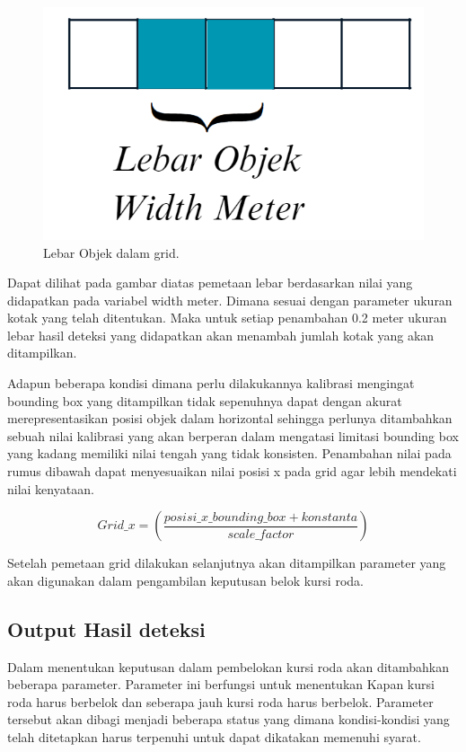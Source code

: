 \begin{figure}[H]
  \centering
  \includegraphics[scale=0.3]{gambar/Lebarobjek.png}
  \caption{Lebar Objek dalam grid.}
  \label{fig:Lebar Objek dalam grid.}
\end{figure}

Dapat dilihat pada gambar diatas pemetaan lebar berdasarkan nilai yang didapatkan pada variabel width meter. Dimana sesuai dengan parameter ukuran kotak yang telah ditentukan. Maka untuk setiap penambahan 0.2 meter ukuran lebar hasil deteksi yang didapatkan akan menambah jumlah kotak yang akan ditampilkan. 

Adapun beberapa kondisi dimana perlu dilakukannya kalibrasi mengingat bounding box yang ditampilkan tidak sepenuhnya dapat dengan akurat merepresentasikan posisi objek dalam horizontal sehingga perlunya ditambahkan sebuah nilai kalibrasi yang akan berperan dalam mengatasi limitasi bounding box yang kadang memiliki nilai tengah yang tidak konsisten. Penambahan nilai pada rumus dibawah dapat menyesuaikan nilai posisi x pada grid agar lebih mendekati nilai kenyataan.

\begin{equation}
    Grid\_x = (\frac{posisi\_x\_bounding\_box +konstanta}{scale\_factor})
\end{equation}

Setelah pemetaan grid dilakukan selanjutnya akan ditampilkan parameter yang akan digunakan dalam pengambilan keputusan belok kursi roda.

\subsection{Output Hasil deteksi}
Dalam menentukan keputusan dalam pembelokan kursi roda akan ditambahkan beberapa parameter. Parameter ini berfungsi untuk menentukan Kapan kursi roda harus berbelok dan seberapa jauh kursi roda harus berbelok. Parameter tersebut akan dibagi menjadi beberapa status yang dimana kondisi-kondisi yang telah ditetapkan harus terpenuhi untuk dapat dikatakan memenuhi syarat.

